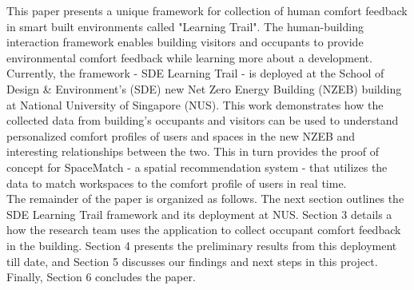 This paper presents a unique framework for collection of human comfort feedback in smart built environments called "Learning Trail". The human-building interaction framework enables building visitors and occupants to provide environmental comfort feedback while learning more about a development. Currently, the framework - SDE Learning Trail - is deployed at the School of Design \& Environment's (SDE) new Net Zero Energy Building (NZEB) building at National University of Singapore (NUS). %
This work demonstrates how the collected data from building's occupants and visitors can be used to understand personalized comfort profiles of users and spaces in the new NZEB and interesting relationships between the two. This in turn provides the proof of concept for SpaceMatch - a spatial recommendation system - that utilizes the data to match workspaces to the comfort profile of users in real time.\\

The remainder of the paper is organized as follows. The next section outlines the SDE Learning Trail framework and its deployment at NUS. Section 3 details a how the research team uses the application to collect occupant comfort feedback in the building. Section 4 presents the preliminary results from this deployment till date, and Section 5 discusses our findings and next steps in this project. Finally, Section 6 concludes the paper. 







